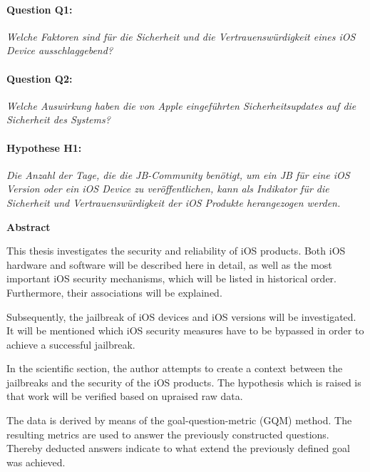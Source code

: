 \paragraph{Question Q1:} \textit{\glqq Welche Faktoren sind für die Sicherheit und die Vertrauenswürdigkeit eines iOS Device ausschlaggebend?\grqq{}}
\paragraph{Question Q2:} \textit{\glqq Welche Auswirkung haben die von Apple eingeführten Sicherheitsupdates auf die Sicherheit des Systems?\grqq{}}        
\paragraph{Hypothese H1:}\textit{\glqq Die Anzahl der Tage, die die JB-Community benötigt, um ein JB für eine iOS Version oder ein iOS Device zu veröffentlichen, kann als Indikator für die Sicherheit und Vertrauenswürdigkeit der iOS Produkte herangezogen werden.\grqq{}}




\cleardoublepage


\begin{center}
{\Large\bfseries Abstract}
\end{center}
This thesis investigates the security and reliability of iOS products. Both iOS hardware and software will be described here in detail, as well as the most important iOS security mechanisms, which will be listed in historical order. Furthermore, their associations will be explained.\par
Subsequently, the jailbreak of iOS devices and iOS versions will be investigated. It will be mentioned which iOS security measures have to be bypassed in order to achieve a successful jailbreak.\par
In the scientific section, the author attempts to create a context between the jailbreaks and the security of the iOS products. The hypothesis which is raised is that work will be verified based on upraised raw data.\par
The data is derived by means of the goal-question-metric (GQM) method. The resulting metrics are used to answer the previously constructed questions. Thereby deducted answers indicate to what extend the previously defined goal was achieved.\par

